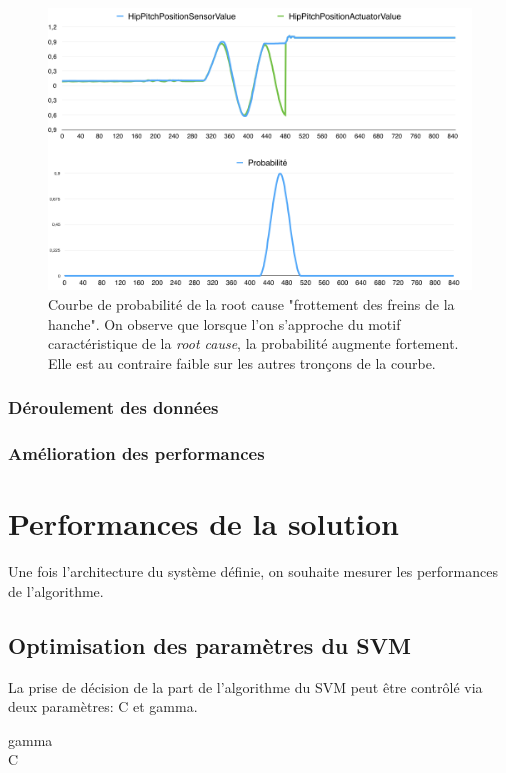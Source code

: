 \begin{figure}[h]
	\centering\includegraphics[width=12cm]{images/proba_motif.png}
	\caption[Courbe de probabilité de la root cause "frottement des freins de la hanche"]{Courbe de probabilité de la root cause "frottement des freins de la hanche".  On observe que lorsque l'on s'approche du motif caractéristique de la \emph{root cause}, la probabilité augmente fortement. Elle est au contraire faible sur les autres tronçons de la courbe.}
	\label{fig:Courbe de probabilité de la root cause "frottement des freins de la hanche"}
\end{figure}

\subsubsection{Déroulement des données}
\label{Automatisation du processus d'investigation: Reconnaissance de motifs: Déroulement des données}


\subsubsection{Amélioration des performances}
\label{Automatisation du processus d'investigation: Reconnaissance de motifs: Amélioration des performances}




\section{Performances de la solution}
\label{Automatisation du processus d'investigation: Performances de la solution}
Une fois l'architecture du système définie, on souhaite mesurer les performances de l'algorithme.

\subsection{Optimisation des paramètres du SVM}
\label{Industrialisation du produit: Performances de la solution:Optimisation des paramètres du SVM}
La prise de décision de la part de l'algorithme du SVM peut être contrôlé via deux paramètres: C et gamma.
\begin{description}
	\item [gamma] 
	\item [C]
\end{description}

